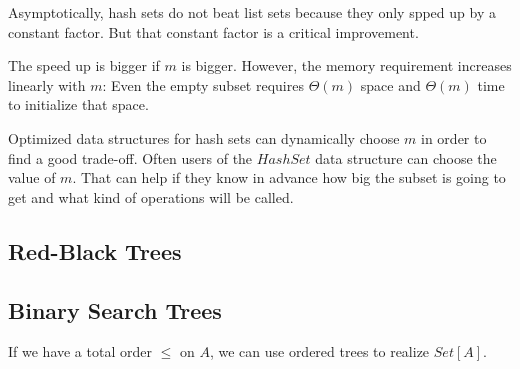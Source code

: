 Asymptotically, hash sets do not beat list sets because they only spped up by a constant factor.
But that constant factor is a critical improvement.

The speed up is bigger if $m$ is bigger.
However, the memory requirement increases linearly with $m$: Even the empty subset requires $\Theta(m)$ space and $\Theta(m)$ time to initialize that space.

Optimized data structures for hash sets can dynamically choose $m$ in order to find a good trade-off.
Often users of the $HashSet$ data structure can choose the value of $m$.
That can help if they know in advance how big the subset is going to get and what kind of operations will be called.

\subsection{Red-Black Trees}\label{sec:ad:redblacktree}


\subsection{Binary Search Trees}\label{sec:ad:bst}

If we have a total order $\leq$ on $A$, we can use ordered trees to realize $Set[A]$.
